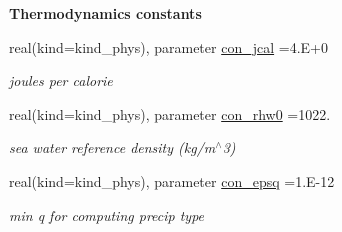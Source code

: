 \begin{Indent}{\bf Thermodynamics constants}
\begin{DoxyCompactItemize}
real(kind=kind\+\_\+phys), parameter \hyperlink{namespacephyscons_a28944c87d997bef79b77dc66847ff041}{con\+\_\+jcal} =4.\+E+0
\begin{DoxyCompactList}\small\item\em joules per calorie \end{DoxyCompactList}\item 
real(kind=kind\+\_\+phys), parameter \hyperlink{namespacephyscons_ae553a2a2cea3086dd27d8f88a56d66e1}{con\+\_\+rhw0} =1022.
\begin{DoxyCompactList}\small\item\em sea water reference density (kg/m$^\wedge$3) \end{DoxyCompactList}\item 
real(kind=kind\+\_\+phys), parameter \hyperlink{namespacephyscons_a990a4a07e2e5e963cac6fd0a9d5939ea}{con\+\_\+epsq} =1.\+E-\/12
\begin{DoxyCompactList}\small\item\em min q for computing precip type \end{DoxyCompactList}\end{DoxyCompactItemize}
\end{Indent}
